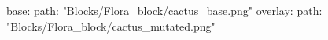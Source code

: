 base:
  path: "Blocks/Flora_block/cactus_base.png"
overlay:
  path: "Blocks/Flora_block/cactus_mutated.png"